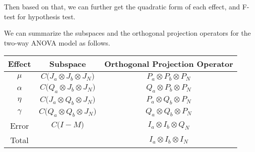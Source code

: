  Then based on that, we can further get the quadratic form of each effect, and F-test for hypothesis test.
 
 We can summarize the subspaces and the orthogonal projection operators for the two-way ANOVA model as follows.
 
 \begin{center}
\begin{tabular}{ c c c }
 Effect & Subspace & Orthogonal Projection Operator \\ 
 \hline
 $\mu$ & $C\Big( J_a \otimes J_b \otimes J_N \Big)$ & $P_a  \otimes P_b \otimes P_N $ \\  
 $\alpha$ & $C\Big( Q_a \otimes J_b \otimes J_N \Big)$ & $Q_a  \otimes P_b \otimes P_N $ \\  
 $\eta$ & $C\Big( J_a \otimes Q_b \otimes J_N \Big)$ & $P_a  \otimes Q_b \otimes P_N $ \\  
 $\gamma$ & $C\Big( Q_a \otimes Q_b \otimes J_N \Big)$ & $Q_a  \otimes Q_b \otimes P_N $ \\  
Error & $C\Big( I-M \Big)$ & $I_a  \otimes I_b \otimes Q_N $ \\  
 \hline
Total &  & $I_a  \otimes I_b \otimes I_N $ \\  
\end{tabular}
\end{center}

